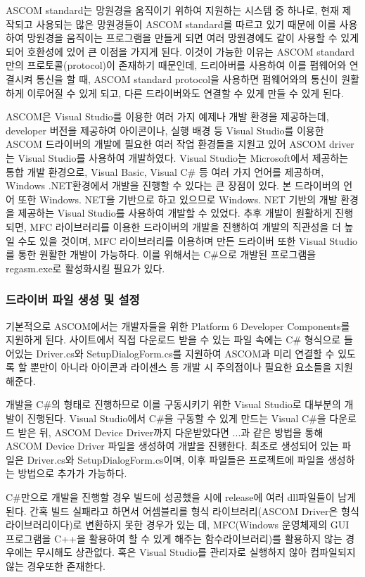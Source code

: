 ASCOM standard는 망원경을 움직이기 위하여 지원하는 시스템 중 하나로, 현재 제작되고 사용되는 많은 망원경들이 ASCOM standard를 따르고 있기 때문에 이를 사용하여 망원경을 움직이는 프로그램을 만들게 되면 여러 망원경에도 같이 사용할 수 있게 되어 호환성에 있어 큰 이점을 가지게 된다. 이것이 가능한 이유는 ASCOM standard 만의 프로토콜(protocol)이 존재하기 때문인데, 드리아버를 사용하여 이를 펌웨어와 연결시켜 통신을 할 때, ASCOM standard protocol을 사용하면 펌웨어와의 통신이 원활하게 이루어질 수 있게 되고, 다른 드라이버와도 연결할 수 있게 만들 수 있게 된다.

ASCOM은 Visual Studio를 이용한 여러 가지 예제나 개발 환경을 제공하는데, developer 버전을 제공하여 아이콘이나, 실행 배경 등 Visual Studio를 이용한 ASCOM 드라이버의 개발에 필요한 여러 작업 환경들을 지원고 있어 ASCOM driver는 Visual Studio를 사용하여 개발하였다. Visual Studio는 Microsoft에서 제공하는 통합 개발 환경으로, Visual Basic, Visual C\# 등 여러 가지 언어를 제공하며, Windows .NET환경에서 개발을 진행할 수 있다는 큰 장점이 있다. 본 드라이버의 언어 또한 Windows. NET을 기반으로 하고 있으므로 Windows. NET 기반의 개발 환경을 제공하는 Visual Studio를 사용하여 개발할 수 있었다. 추후 개발이 원활하게 진행되면, MFC 라이브러리를 이용한 드라이버의 개발을 진행하여 개발의 직관성을 더 높일 수도 있을 것이며, MFC 라이브러리를 이용하며 만든 드라이버 또한 Visual Studio를 통한 원활한 개발이 가능하다. 이를 위해서는 C\#으로 개발된 프로그램을 regasm.exe로 활성화시킬 필요가 있다.

\subsubsection{드라이버 파일 생성 및 설정}
기본적으로 ASCOM에서는 개발자들을 위한 Platform 6 Developer Components를 지원하게 된다. 사이트에서 직접 다운로드 받을 수 있는 파일 속에는 C\# 형식으로 들어있는 Driver.cs와 SetupDialogForm.cs를 지원하여 ASCOM과 미리 연결할 수 있도록 할 뿐만이 아니라 아이콘과 라이센스 등 개발 시 주의점이나 필요한 요소들을 지원해준다.

개발을 C\#의 형태로 진행하므로 이를 구동시키기 위한 Visual Studio로 대부분의 개발이 진행된다. Visual Studio에서 C\#을 구동할 수 있게 만드는 Visual C\#을 다운로드 받은 뒤, ASCOM Device Driver까지 다운받았다면 ...과 같은 방법을 통해 ASCOM Device Driver 파일을 생성하여 개발을 진행한다. 최초로 생성되어 있는 파일은 Driver.cs와 SetupDialogForm.cs이며, 이후 파일들은 프로젝트에 파일을 생성하는 방법으로 추가가 가능하다.

C\#만으로 개발을 진행할 경우 빌드에 성공했을 시에 release에 여러 dll파일들이 남게 된다. 간혹 빌드 실패라고 하면서 어셈블리를 형식 라이브러리(ASCOM Driver은 형식 라이브러리이다)로 변환하지 못한 경우가 있는 데, MFC(Windows 운영체제의 GUI 프로그램을  C++을 활용하여 할 수 있게 해주는 함수라이브러리)를 활용하지 않는 경우에는 무시해도 상관없다. 혹은 Visual Studio를 관리자로 실행하지 않아 컴파일되지 않는 경우또한 존재한다.

